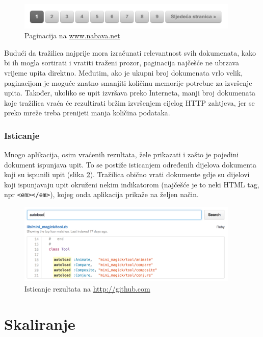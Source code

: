 \documentclass[a4paper,twoside,12pt]{scrreprt}
\begin{document}
\begin{figure}[H]
  \centering
  \includegraphics[width=300pt]{pagination}
  \caption{Paginacija na \url{www.nabava.net}}
  \label{pagination}
\end{figure}

Budući da tražilica najprije mora izračunati relevantnost svih dokumenata, kako bi ih mogla sortirati i vratiti traženi prozor, paginacija najčešće ne ubrzava vrijeme upita direktno. Međutim, ako je ukupni broj dokumenata vrlo velik, paginacijom je moguće znatno smanjiti količinu memorije potrebne za izvršenje upita. Također, ukoliko se upit izvršava preko Interneta, manji broj dokumenata koje tražilica vraća će rezultirati bržim izvršenjem cijelog HTTP zahtjeva, jer se preko mreže treba prenijeti manja količina podataka.

\subsection{Isticanje}

Mnogo aplikacija, osim vraćenih rezultata, žele prikazati i zašto je pojedini dokument ispunjava upit. To se postiže isticanjem određenih dijelova dokumenta koji su ispunili upit (slika \ref{highlighting}). Tražilica obično vrati dokumente gdje su dijelovi koji ispunjavaju upit okruženi nekim indikatorom (najčešće je to neki HTML tag, npr \texttt{<em></em>}), kojeg onda aplikacija prikaže na željen način.

\begin{figure}[H]
  \centering
  \includegraphics[width=300pt]{highlighting}
  \caption{Isticanje rezultata na \url{http://github.com}}
  \label{highlighting}
\end{figure}

\chapter{Skaliranje}
\end{document}
